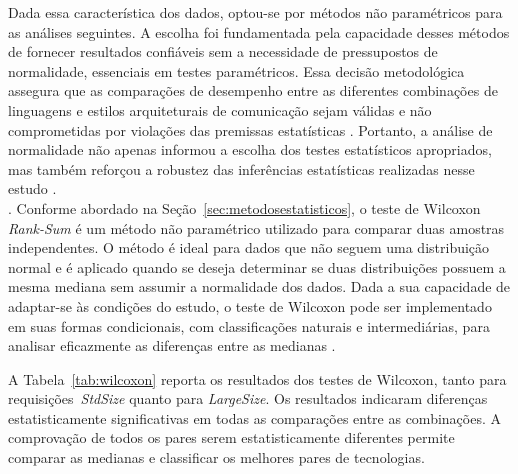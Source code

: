 Dada essa característica dos dados, optou-se por métodos não paramétricos para as análises seguintes.
A escolha foi fundamentada pela capacidade desses métodos de fornecer resultados confiáveis sem a necessidade de pressupostos de normalidade, essenciais em testes paramétricos.
Essa decisão metodológica assegura que as comparações de desempenho entre as diferentes combinações de linguagens e estilos arquiteturais de comunicação sejam válidas e não comprometidas por violações das premissas estatísticas \cite{Holovnia2023}.
Portanto, a análise de normalidade não apenas informou a escolha dos testes estatísticos apropriados, mas também reforçou a robustez das inferências estatísticas realizadas nesse estudo \cite{Habibzadeh2024}.\\[-0.2cm]

. 
Conforme abordado na Seção~\ref{sec:metodosestatisticos}, 
o teste de Wilcoxon \textit{Rank-Sum} é um método não paramétrico utilizado para comparar duas amostras independentes. O método é ideal para dados que não seguem uma distribuição normal e é aplicado quando se deseja determinar se duas distribuições possuem a mesma mediana sem assumir a normalidade dos dados. Dada a sua capacidade de adaptar-se às condições do estudo, o teste de Wilcoxon pode ser implementado em suas formas condicionais, com classificações naturais e intermediárias, para analisar eficazmente as diferenças entre as medianas \cite{Pokropp1992}.

A Tabela~\ref{tab:wilcoxon} reporta os resultados dos testes de Wilcoxon, tanto para requisições~\textit{StdSize} quanto para \textit{LargeSize}. Os resultados indicaram diferenças estatisticamente significativas em todas as comparações 
entre as combinações.
{A comprovação de todos os pares serem estatisticamente diferentes permite comparar as medianas e classificar os melhores pares de tecnologias.}


